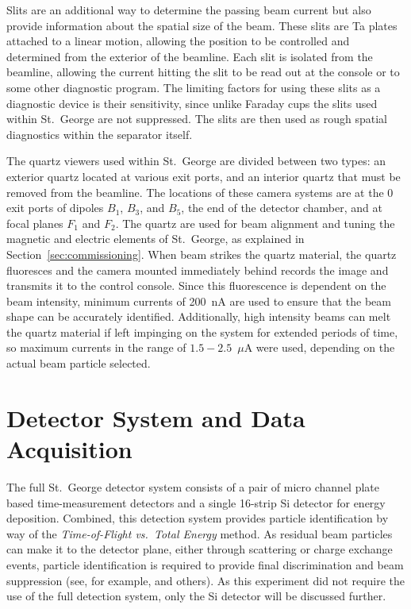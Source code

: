 Slits are an additional way to determine the passing beam current but
also provide information about the spatial size of the beam. These slits
are Ta plates attached to a linear motion, allowing the position to be
controlled and determined from the exterior of the beamline. Each slit
is isolated from the beamline, allowing the current hitting the slit to
be read out at the console or to some other diagnostic program. The
limiting factors for using these slits as a diagnostic device is their
sensitivity, since unlike Faraday cups the slits used within St.\ George
are not suppressed. The slits are then used as rough spatial diagnostics
within the separator itself.

The quartz viewers used within St.\ George are divided between two
types: an exterior quartz located at various exit ports, and an interior
quartz that must be removed from the beamline. The locations of these
camera systems are at the 0\degree{} exit ports of dipoles $B_1$, $B_3$,
and $B_5$, the end of the detector chamber, and at focal planes $F_1$
and $F_2$. The quartz are used for beam alignment and tuning the
magnetic and electric elements of St.\ George, as explained in
Section~\ref{sec:commissioning}. When beam strikes the quartz material,
the quartz fluoresces and the camera mounted immediately behind records
the image and transmits it to the control console. Since this
fluorescence is dependent on the beam intensity, minimum currents of
200~nA are used to ensure that the beam shape can be accurately
identified. Additionally, high intensity beams can melt the quartz
material if left impinging on the system for extended periods of time,
so maximum currents in the range of $1.5-2.5$~$\mu$A were used,
depending on the actual beam particle selected.


\section{Detector System and Data Acquisition}
\label{sec:detector}

The full St.\ George detector system consists of a pair of micro channel
plate based time-measurement detectors and a single 16-strip Si detector
for energy deposition. Combined, this detection system provides particle
identification by way of the \textit{Time\--{}of\--{}Flight vs.\ Total
Energy} method. As residual beam particles can make it to the detector
plane, either through scattering or charge exchange events, particle
identification is required to provide final discrimination and beam
suppression (see, for example, \cite{James1988, Angulo2001, Engel2005,
DiLeva2008} and others). As this experiment did not require the use of
the full detection system, only the Si detector will be discussed
further.

